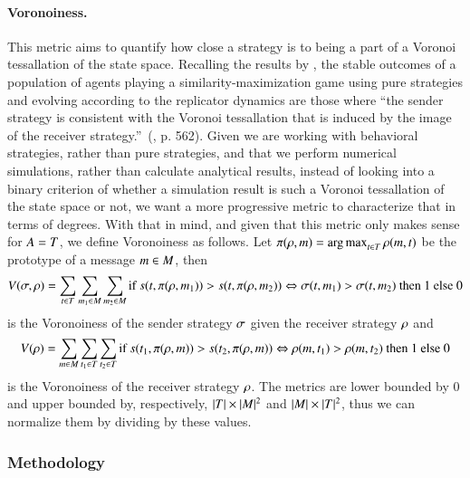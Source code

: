 \paragraph{Voronoiness.}
This metric aims to quantify how close a strategy is to being a part of a Voronoi tessallation of the state space.
Recalling the results by \cite{Jager2007}, the stable outcomes of a population of agents playing a similarity-maximization game using pure strategies and evolving according to the replicator dynamics are those where ``the sender strategy is consistent with the Voronoi tessallation that is induced by the image of the receiver strategy.''~(\cite{Jager2007}, p. 562).
Given we are working with behavioral strategies, rather than pure strategies, and that we perform numerical simulations, rather than calculate analytical results, instead of looking into a binary criterion of whether a simulation result is such a Voronoi tessallation of the state space or not, we want a more progressive metric to characterize that in terms of degrees.
With that in mind, and given that this metric only makes sense for $A = T$, we define Voronoiness as follows.
Let $\pi(\rho, m) = \operatorname*{arg\,max}_{t \in T}\rho(m,t)$ be the prototype of a message $m \in M$, then
\begin{multline*}
  V(\sigma, \rho) = \sum_{t \in T} \sum_{m_1 \in M} \sum_{m_2 \in M} \textrm{if } s(t, \pi(\rho, m_1)) > s(t, \pi(\rho, m_2)) \Leftrightarrow \sigma(t, m_1) > \sigma(t, m_2) \textrm{ then } 1 \textrm{ else } 0
\end{multline*}
is the Voronoiness of the sender strategy $\sigma$ given the receiver strategy $\rho$ and
\begin{align*}
  V(\rho) = \sum_{m \in M} \sum_{t_1 \in T} \sum_{t_2 \in T} \textrm{if } s(t_1, \pi(\rho, m)) > s(t_2, \pi(\rho, m)) \Leftrightarrow \rho(m, t_1) > \rho(m, t_2) \textrm{ then } 1 \textrm{ else } 0
\end{align*}
is the Voronoiness of the receiver strategy $\rho$.
The metrics are lower bounded by $0$ and upper bounded by, respectively, $|T| \times |M|^2$ and $|M| \times |T|^2$, thus we can normalize them by dividing by these values.

\subsubsection{Methodology}

